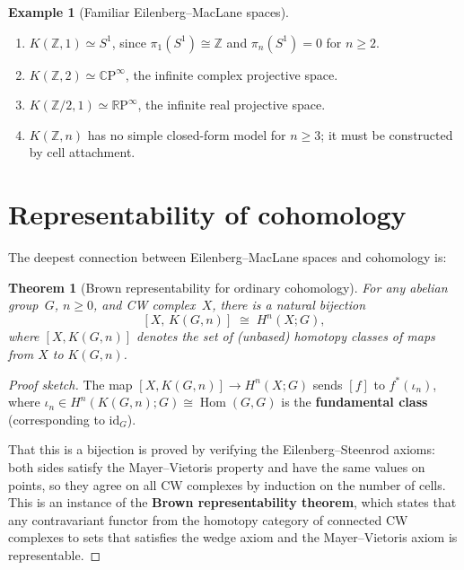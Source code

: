 \documentclass[12pt,a4paper,openany]{book}
\theoremstyle{definition}
\newtheorem{example}[definition]{Example}
\theoremstyle{plain}
\newtheorem{theorem}[definition]{Theorem}
\theoremstyle{remark}
\newcommand{\Z}{\mathbb{Z}}
\newcommand{\RP}{\mathbb{R}\mathrm{P}}
\newcommand{\CP}{\mathbb{C}\mathrm{P}}
\DeclareMathOperator{\Hom}{Hom}
\begin{document}
\begin{example}[Familiar Eilenberg--MacLane spaces]
\begin{enumerate}[label=(\roman*)]
  \item $K(\Z,1)\simeq S^1$, since $\pi_1(S^1)\cong\Z$ and
    $\pi_n(S^1)=0$ for $n\ge2$.
  \item $K(\Z,2)\simeq\CP^\infty$, the infinite complex projective
    space.
  \item $K(\Z/2,1)\simeq\RP^\infty$, the infinite real projective space.
  \item $K(\Z,n)$ has no simple closed-form model for $n\ge3$; it
    must be constructed by cell attachment.
\end{enumerate}
\end{example}

\section{Representability of cohomology}\label{sec:brown-representability}

The deepest connection between Eilenberg--MacLane spaces and
cohomology is:

\begin{theorem}[Brown representability for ordinary cohomology]
\label{thm:brown-representability}
For any abelian group~$G$, $n\ge0$, and CW complex~$X$, there is a
natural bijection
\[
  [X,\,K(G,n)]
  \;\cong\;
  H^n(X;G),
\]
where $[X,K(G,n)]$ denotes the set of (unbased) homotopy classes of
maps from $X$ to $K(G,n)$.
\end{theorem}

\begin{proof}[Proof sketch]
The map $[X,K(G,n)]\to H^n(X;G)$ sends $[f]$ to $f^*(\iota_n)$,
where $\iota_n\in H^n(K(G,n);G)\cong\Hom(G,G)$ is the
\textbf{fundamental class}
(corresponding to $\mathrm{id}_G$).

That this is a bijection is proved by verifying the
Eilenberg--Steenrod axioms: both sides satisfy the Mayer--Vietoris
property and have the same values on points, so they agree on all
CW complexes by induction on the number of cells.  This is an instance
of the \textbf{Brown representability theorem}, which states that any contravariant functor
from the homotopy category of connected CW complexes to sets that
satisfies the wedge axiom and the Mayer--Vietoris axiom is
representable.
\end{proof}
\end{document}
